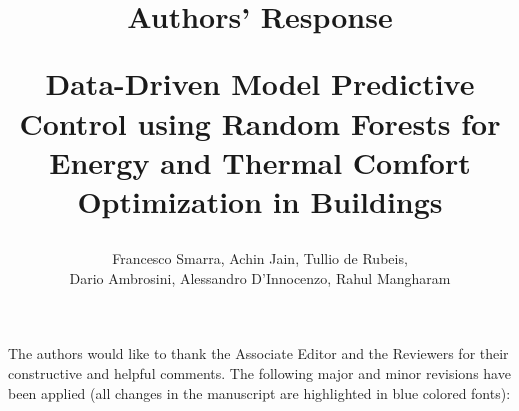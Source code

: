 \documentclass{article}
\begin{document}
\title{Authors' Response \\
\begin{Large}
	Data-Driven Model Predictive Control using Random Forests for Energy and Thermal Comfort Optimization in Buildings
\end{Large}
}

\author{Francesco Smarra, Achin Jain, Tullio de Rubeis, \\ Dario Ambrosini, Alessandro D’Innocenzo, Rahul Mangharam}



\date{}

\maketitle



\bigskip



The authors would like to thank the Associate Editor and the Reviewers for their constructive and helpful comments. The following major and minor revisions have been applied (all changes in the manuscript are highlighted in \textcolor[rgb]{0.00,0.00,1.00}{blue colored fonts}):
\end{document}
